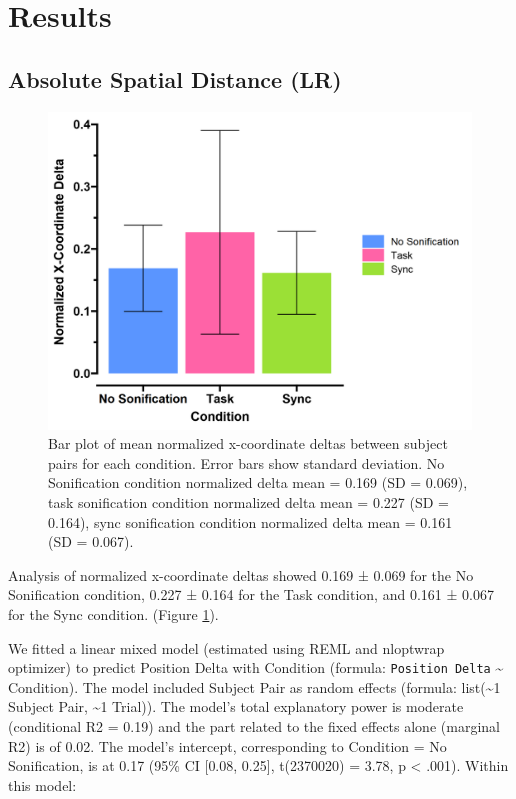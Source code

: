 \documentclass[10pt,a4paper,onecolumn]{article}
\begin{document}
\hypertarget{results}{%
\section{Results}\label{results}}

\hypertarget{absolute-spatial-distance-lr-1}{%
\subsection{Absolute Spatial Distance (LR)}\label{absolute-spatial-distance-lr-1}}

\begin{figure}[h]

{\centering \includegraphics[width=1\linewidth]{figures/parwise_position_delta} 

}

\caption{Bar plot of mean normalized x-coordinate deltas between subject pairs for each condition. Error bars show standard deviation. No Sonification condition normalized delta mean  = 0.169 (SD = 0.069), task sonification condition normalized delta mean = 0.227 (SD = 0.164), sync sonification condition normalized delta mean = 0.161 (SD = 0.067).}\label{fig:pairwise-position-delta}
\end{figure}

Analysis of normalized x-coordinate deltas showed 0.169 ± 0.069 for the No Sonification condition,
0.227 ± 0.164 for the Task condition, and
0.161 ± 0.067 for the Sync condition. (Figure \ref{fig:pairwise-position-delta}).

We fitted a linear mixed model (estimated using REML and nloptwrap optimizer) to predict Position Delta with Condition (formula: \texttt{Position\ Delta} \textasciitilde{} Condition). The model included Subject Pair as random effects (formula: list(\textasciitilde1 \textbar{} Subject Pair, \textasciitilde1 \textbar{} Trial)). The model's total explanatory power is moderate (conditional R2 = 0.19) and the part related to the fixed effects alone (marginal R2) is of 0.02. The model's intercept, corresponding to Condition = No Sonification, is at 0.17 (95\% CI {[}0.08, 0.25{]}, t(2370020) = 3.78, p \textless{} .001). Within this model:
\end{document}
